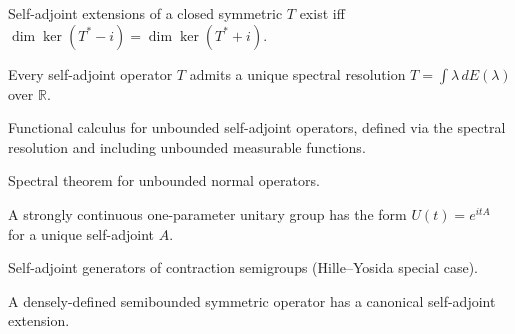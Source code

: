 \begin{theorem}
  \label{thm:deficiency-indices}
  \leanok
  Self-adjoint extensions of a closed symmetric $T$ exist iff
  $\dim \ker(T^* - i) = \dim \ker(T^* + i)$.
\end{theorem}

\begin{theorem}
  \label{thm:spectral-unbounded-selfAdjoint}
  \leanok
  Every self-adjoint operator $T$ admits a unique spectral resolution
  $T = \int \lambda \, dE(\lambda)$ over $\mathbb R$.
\end{theorem}

\begin{theorem}
  \label{thm:unbounded-fc}
  \leanok
  Functional calculus for unbounded self-adjoint operators, defined
  via the spectral resolution and including unbounded measurable
  functions.
\end{theorem}

\begin{theorem}
  \label{thm:spectral-unbounded-normal}
  \leanok
  Spectral theorem for unbounded normal operators.
\end{theorem}

\begin{theorem}
  \label{thm:stone-theorem}
  \leanok
  A strongly continuous one-parameter unitary group has the form
  $U(t) = e^{itA}$ for a unique self-adjoint $A$.
\end{theorem}

\begin{theorem}
  \label{thm:selfAdjoint-contraction}
  \leanok
  Self-adjoint generators of contraction semigroups (Hille--Yosida
  special case).
\end{theorem}

\begin{theorem}
  \label{thm:friedrichs}
  \leanok
  A densely-defined semibounded symmetric operator has a canonical
  self-adjoint extension.
\end{theorem}
